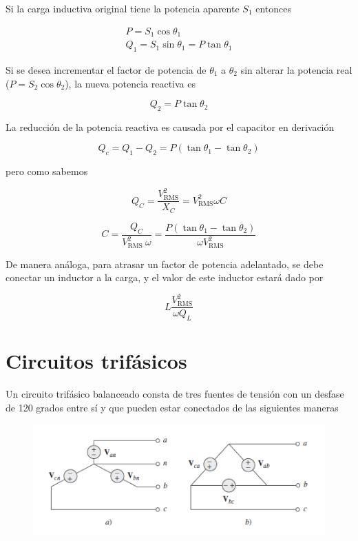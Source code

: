 Si la carga inductiva original tiene la potencia aparente $S_1$ entonces

\begin{eqnarray*}
P = S_1 \cos \theta_1 \\
Q_1 = S_1 \sin \theta_1 = P \tan \theta_1
\end{eqnarray*}

Si se desea incrementar el factor de potencia de $\theta_1$ a $\theta_2$ sin alterar la potencia real ($P = S_2 \cos \theta_2$), la nueva potencia reactiva es 

\begin{equation*}
Q_2 = P \tan \theta_2
\end{equation*}

La reducción de la potencia reactiva es causada por el capacitor en derivación

\begin{equation*}
Q_c = Q_1 - Q_2 = P(\tan \theta_1 - \tan \theta_2)
\end{equation*}

pero como sabemos 

\begin{equation*}
Q_C = \frac{V_\text{RMS}^2}{X_C} = V_\text{RMS}^2 \omega C
\end{equation*}

\begin{equation*}
C = \frac{Q_C}{V_\text{RMS}^2 \ \omega} = \frac{P (\tan \theta_1 - \tan \theta_2)}{\omega V_\text{RMS}^2}
\end{equation*}

De manera análoga, para atrasar un factor de potencia adelantado, se debe conectar un inductor a la carga, y el valor de este inductor estará dado por

\begin{equation*}
L \frac{V_\text{RMS}^2}{\omega Q_L}
\end{equation*}


\section{Circuitos trifásicos}

Un circuito trifásico balanceado consta de tres fuentes de tensión con un desfase de 120 grados entre sí y que pueden estar conectados de las siguientes maneras

\begin{figure}
    \centering
    \includegraphics{Elect_circ/trif_f1.png}
\end{figure}


